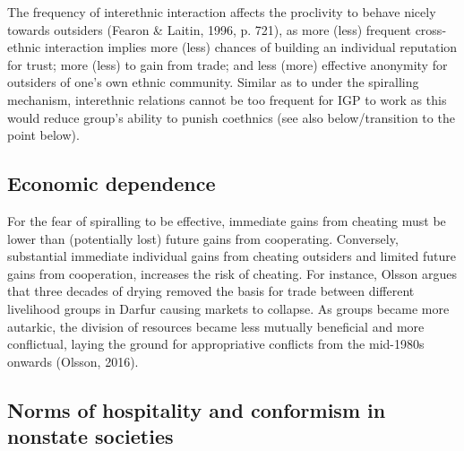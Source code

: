\documentclass[12pt]{article}
\begin{document}
The frequency of interethnic interaction affects the proclivity to behave nicely
towards outsiders (Fearon \& Laitin, 1996, p. 721), as more (less) frequent
cross-ethnic interaction implies more (less) chances of building an individual
reputation for trust; more (less) to gain from trade; and less (more) effective
anonymity for outsiders of one’s own ethnic community. Similar as to under the
spiralling mechanism, interethnic relations cannot be too frequent for IGP to
work as this would reduce group’s ability to punish coethnics (see also
below/transition to the point below).


\subsection{Economic dependence}

For the fear of spiralling to be effective, immediate gains from cheating must
be lower than (potentially lost) future gains from cooperating. Conversely,
substantial immediate individual gains from cheating outsiders and limited
future gains from cooperation, increases the risk of cheating. For instance,
Olsson argues that three decades of drying removed the basis for trade between
different livelihood groups in Darfur causing markets to collapse. As groups
became more autarkic, the division of resources became less mutually beneficial
and more conflictual, laying the ground for appropriative conflicts from the
mid-1980s onwards (Olsson, 2016).

\subsection{Norms of hospitality and conformism in nonstate societies}
\end{document}
